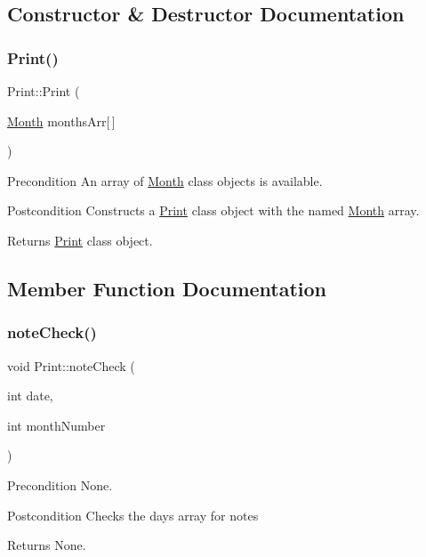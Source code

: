 \subsection{Constructor \& Destructor Documentation}
\hypertarget{class_print_a7b9e4716438a4d6003fb53d740172463}{}\label{class_print_a7b9e4716438a4d6003fb53d740172463} 
\subsubsection{\texorpdfstring{Print()}{Print()}}
{\footnotesize\ttfamily Print\+::\+Print (\begin{DoxyParamCaption}\item[{\hyperlink{class_month}{Month}}]{months\+Arr\mbox{[}$\,$\mbox{]} }\end{DoxyParamCaption})}

\begin{DoxyPrecond}{Precondition}
An array of \hyperlink{class_month}{Month} class objects is available. 
\end{DoxyPrecond}
\begin{DoxyPostcond}{Postcondition}
Constructs a \hyperlink{class_print}{Print} class object with the named \hyperlink{class_month}{Month} array. 
\end{DoxyPostcond}
\begin{DoxyReturn}{Returns}
\hyperlink{class_print}{Print} class object. 
\end{DoxyReturn}


\subsection{Member Function Documentation}
\hypertarget{class_print_ae528ed0fc9fe31222a1fcd33fe58d45b}{}\label{class_print_ae528ed0fc9fe31222a1fcd33fe58d45b} 
\subsubsection{\texorpdfstring{note\+Check()}{noteCheck()}}
{\footnotesize\ttfamily void Print\+::note\+Check (\begin{DoxyParamCaption}\item[{int}]{date,  }\item[{int}]{month\+Number }\end{DoxyParamCaption})}

\begin{DoxyPrecond}{Precondition}
None. 
\end{DoxyPrecond}
\begin{DoxyPostcond}{Postcondition}
Checks the days array for notes 
\end{DoxyPostcond}
\begin{DoxyReturn}{Returns}
None. 
\end{DoxyReturn}
\hypertarget{class_print_adcc0b985904ceb75634e3bb0b156d033}{}\label{class_print_adcc0b985904ceb75634e3bb0b156d033} 
